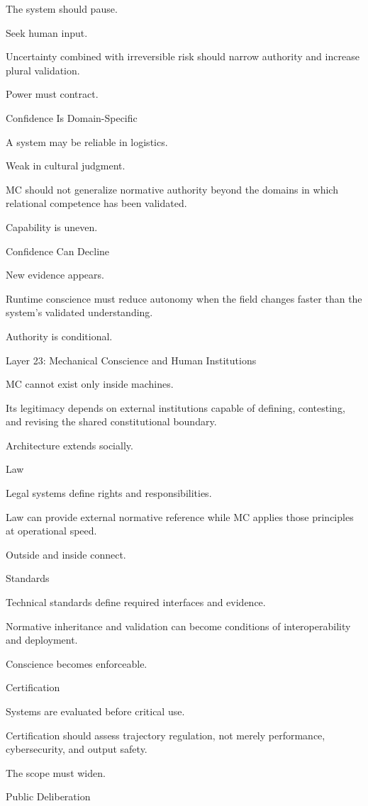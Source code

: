 The system should pause.

Seek human input.

Uncertainty combined with irreversible risk should narrow authority and increase plural validation.

Power must contract.

Confidence Is Domain-Specific

A system may be reliable in logistics.

Weak in cultural judgment.

MC should not generalize normative authority beyond the domains in which relational competence has been validated.

Capability is uneven.

Confidence Can Decline

New evidence appears.

Runtime conscience must reduce autonomy when the field changes faster than the system’s validated understanding.

Authority is conditional.

Layer 23: Mechanical Conscience and Human Institutions

MC cannot exist only inside machines.

Its legitimacy depends on external institutions capable of defining, contesting, and revising the shared constitutional boundary.

Architecture extends socially.

Law

Legal systems define rights and responsibilities.

Law can provide external normative reference while MC applies those principles at operational speed.

Outside and inside connect.

Standards

Technical standards define required interfaces and evidence.

Normative inheritance and validation can become conditions of interoperability and deployment.

Conscience becomes enforceable.

Certification

Systems are evaluated before critical use.

Certification should assess trajectory regulation, not merely performance, cybersecurity, and output safety.

The scope must widen.

Public Deliberation

